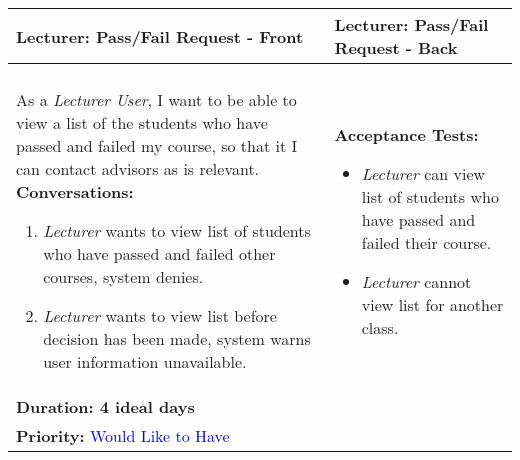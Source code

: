 \documentclass[11pt]{article}
\begin{document}
\begin{center}
\begin{tabular}{ | m{8cm}  |  m{8cm}  | } 
 \hline
 \textbf{Lecturer: Pass/Fail Request - Front} &  \textbf{Lecturer: Pass/Fail Request - Back}  \\ 
  \hline
&\\[5pt]
As a \emph{Lecturer User}, I want to be able to view a list of the students who have passed and failed my course, so that it I can contact advisors as is relevant.
\newline
\textbf{Conversations:}
\begin{enumerate}
\item{\emph{Lecturer} wants to view list of students who have passed and failed other courses, system denies.}
\item{\emph{Lecturer} wants to view list before decision has been made, system warns user information unavailable.}
\end{enumerate}
& \textbf{Acceptance Tests:} 
\begin{itemize}
\item{\emph{Lecturer} can view list of students who have passed and failed their course.}
\item{\emph{Lecturer} cannot view list for another class.}
\end{itemize} \\
\textbf{Duration: 4 ideal days} &\\
\textbf{Priority:}  \textcolor{blue}{Would Like to Have} & \\
 \hline
\end{tabular}
\end{center}
\end{document}
